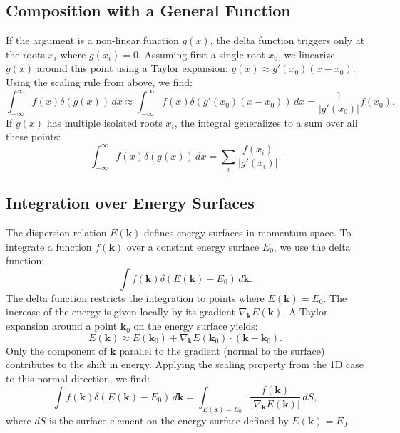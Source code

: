 \documentclass[11pt]{article}
\begin{document}
\subsection{Composition with a General Function}
If the argument is a non-linear function $g(x)$, the delta function triggers only at the roots $x_i$ where $g(x_i) = 0$. 
Assuming first a single root $x_0$, we linearize $g(x)$ around this point using a Taylor expansion: $g(x) \approx g'(x_0)(x - x_0)$. Using the scaling rule from above, we find:
\[
\int_{-\infty}^{\infty} f(x) \delta(g(x)) \, dx \approx \int_{-\infty}^{\infty} f(x) \delta(g'(x_0)(x - x_0)) \, dx = \frac{1}{|g'(x_0)|} f(x_0).
\]
If $g(x)$ has multiple isolated roots $x_i$, the integral generalizes to a sum over all these points:
\[
\int_{-\infty}^{\infty} f(x) \delta(g(x)) \, dx = \sum_i \frac{f(x_i)}{|g'(x_i)|}.
\]      
\subsection{Integration over Energy Surfaces}
The dispersion relation $E(\mathbf{k})$ defines energy surfaces in momentum space. To integrate a function $f(\mathbf{k})$ over a constant energy surface $E_0$, we use the delta function:
\[
\int f(\mathbf{k}) \delta(E(\mathbf{k}) - E_0) \, d\mathbf{k}.
\]
The delta function restricts the integration to points where $E(\mathbf{k}) = E_0$. 
The increase of the energy is given locally by its gradient $\nabla_{\mathbf{k}} E(\mathbf{k})$. A Taylor expansion around a point $\mathbf{k}_0$ on the energy surface yields:
\[
E(\mathbf{k}) \approx E(\mathbf{k}_0) + \nabla_{\mathbf{k}} E(\mathbf{k}_0) \cdot (\mathbf{k} - \mathbf{k}_0).
\]
Only the component of $\mathbf{k}$ parallel to the gradient (normal to the surface) contributes to the shift in energy. Applying the scaling property from the 1D case to this normal direction, we find:
\[
\int f(\mathbf{k}) \delta(E(\mathbf{k}) - E_0) \, d\mathbf{k} = \int_{E(\mathbf{k}) = E_0} \frac{f(\mathbf{k})}{|\nabla_{\mathbf{k}} E(\mathbf{k})|} \, dS,
\]
where $dS$ is the surface element on the energy surface defined by $E(\mathbf{k}) = E_0$.
\end{document}
